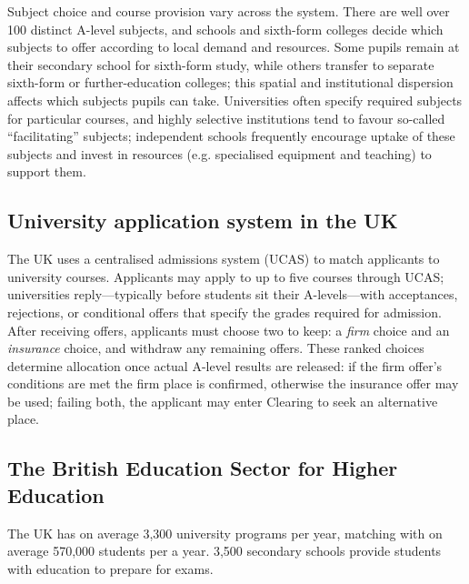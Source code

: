 Subject choice and course provision vary across the system. There are well over 100 distinct A-level subjects, and schools and sixth-form colleges decide which subjects to offer according to local demand and resources. Some pupils remain at their secondary school for sixth-form study, while others transfer to separate sixth-form or further-education colleges; this spatial and institutional dispersion affects which subjects pupils can take. Universities often specify required subjects for particular courses, and highly selective institutions tend to favour so-called ``facilitating'' subjects; independent schools frequently encourage uptake of these subjects and invest in resources (e.g. specialised equipment and teaching) to support them.

\subsection{University application system in the UK}
The UK uses a centralised admissions system (UCAS) to match applicants to university courses. Applicants may apply to up to five courses through UCAS; universities reply—typically before students sit their A-levels—with acceptances, rejections, or conditional offers that specify the grades required for admission. After receiving offers, applicants must choose two to keep: a \emph{firm} choice and an \emph{insurance} choice, and withdraw any remaining offers. These ranked choices determine allocation once actual A-level results are released: if the firm offer’s conditions are met the firm place is confirmed, otherwise the insurance offer may be used; failing both, the applicant may enter Clearing to seek an alternative place.

\subsection{The British Education Sector for Higher Education}
The UK has on average 3,300 university programs per year, matching with on average 570,000 students per a year. 3,500 secondary schools provide students with education to prepare for exams.

